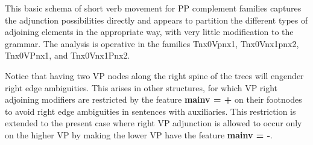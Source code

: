 This basic schema of short verb movement for PP complement families
captures the adjunction possibilities directly and appears to partition
the different types of adjoining elements in the appropriate way, with
very little modification to the grammar. The analysis is operative
in the families Tnx0Vpnx1, Tnx0Vnx1pnx2, Tnx0VPnx1, and Tnx0Vnx1Pnx2.

Notice that having two VP nodes along the right spine of the trees will
engender right edge ambiguities. This arises in other structures, for which
VP right adjoining modifiers are restricted by the feature {\bf mainv = +}
on their footnodes to avoid right edge ambiguities in sentences with
auxiliaries. This restriction is extended to the present case where right
VP adjunction is allowed to occur only on the higher VP by making the lower
VP have the feature {\bf mainv = -}.
